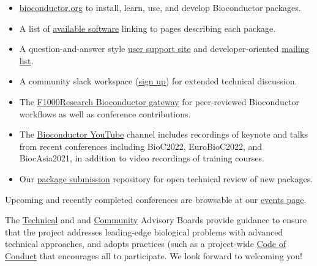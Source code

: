 \begin{itemize}
\tightlist
\item
  \href{https://bioconductor.org}{bioconductor.org} to install,
  learn, use, and develop Bioconductor packages.
\item
  A list of \href{https://bioconductor.org/packages}{available software}
  linking to pages describing each package.
\item
  A question-and-answer style
  \href{https://support.bioconductor.org}{user support site} and
  developer-oriented \href{https://stat.ethz.ch/mailman/listinfo/bioc-devel}{mailing list}.
\item
  A community slack workspace (\href{https://slack.bioconductor.org}{sign up})
  for extended technical discussion.
\item
  The \href{https://f1000research.com/gateways/bioconductor}{F1000Research Bioconductor gateway}
  for peer-reviewed Bioconductor workflows as well as conference contributions.
\item
  The \href{https://www.youtube.com/user/bioconductor}{Bioconductor YouTube}
  channel includes recordings of keynote and talks from recent
  conferences including BioC2022, EuroBioC2022, and BiocAsia2021, in addition to
  video recordings of training courses.
\item
  Our \href{https://github.com/Bioconductor/Contributions}{package submission}
  repository for open technical review of new packages.
\end{itemize}

Upcoming and recently completed conferences are browsable at our
\href{https://bioconductor.org/help/events/}{events page}.

The \href{https://bioconductor.org/about/technical-advisory-board/}{Technical}
and and \href{https://bioconductor.org/about/community-advisory-board/}{Community}
Advisory Boards provide guidance to ensure that the project addresses
leading-edge biological problems with advanced technical approaches,
and adopts practices (such as a
project-wide \href{https://bioconductor.org/about/code-of-conduct/}{Code of Conduct}
that encourages all to participate. We look forward to
welcoming you!

\address{Bioconductor Core Team \\
    Channing Division of Network Medicine \\
    Mass General Brigham \\
    Harvard Medical School, Boston, MA \\ \\
    Department of Data Science \\
    Dana-Farber Cancer Institute \\
    Harvard Medical School, Boston, MA \\ \\
    Biostatistics and Bioinformatics \\
    Roswell Park Comprehensive Cancer Center, Buffalo, NY \\ \\
    Fred Hutchinson Cancer Research Center, Seatlle, WA \\ \\
    CUNY Graduate School of Public Health, New York, NY}


